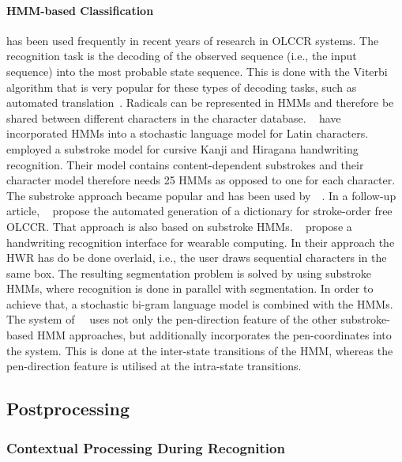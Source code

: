 \paragraph{HMM-based Classification} has been used frequently in recent years of
research in OLCCR systems. The recognition task is the decoding of the 
observed sequence (i.e., the input sequence) into the most probable state 
sequence. This is done with the Viterbi algorithm that is very popular for
these types of decoding tasks, such as automated 
translation~. Radicals can be represented in HMMs and 
therefore be shared between different characters in the character database.
~\citeyear{Hu1996} have incorporated HMMs into a 
stochastic language model for Latin characters. 
~\citeyear{Tokuno2002} employed a substroke model for 
cursive Kanji and Hiragana handwriting recognition. Their model contains 
content-dependent substrokes and their character model therefore needs 25 HMMs
as opposed to one for each character. The substroke approach became popular
and has been used by~~\citeyear{Nakai2001}. 
In a follow-up article, ~\citeyear{Nakai2003} propose 
the automated generation of a dictionary for 
stroke-order free OLCCR. That approach is also based on substroke HMMs.
~\citeyear{Shimodaira2003} propose a 
handwriting recognition interface for 
wearable computing. In their approach the HWR has do be done overlaid, i.e., the
user draws sequential characters in the same box. The resulting segmentation
problem is solved by using substroke HMMs, where recognition is done in parallel
with segmentation. In order to achieve that, a stochastic bi-gram language model
is combined with the HMMs.
The system of~~\citeyear{Okumura2005} uses not only 
the pen-direction feature of the other substroke-based HMM approaches, 
but additionally incorporates the pen-coordinates into the system. 
This is done at the inter-state transitions of the HMM, whereas the pen-direction
feature is utilised at the intra-state transitions.

\subsection{Postprocessing}
\label{sec:olccr:postprocessing}

\subsubsection{Contextual Processing During Recognition}
\label{sec:olccr:contextualprocessingduring}

